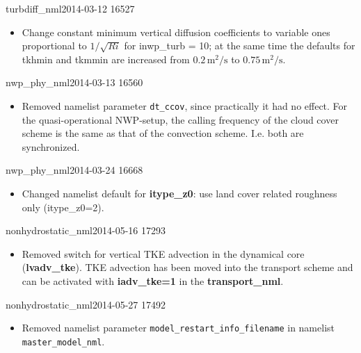 \begin{changeitem}{turbdiff\_nml}{2014-03-12 }{16527 }
  \begin{itemize}
   \item Change constant minimum vertical diffusion coefficients to variable ones proportional to $1/\sqrt{Ri}$ for inwp\_turb = 10; at the same time
         the defaults for tkhmin and tkmmin are increased from $0.2 \, \mathrm{m^2/s}$ to $0.75 \, \mathrm{m^2/s}$.
  \end{itemize}
\end{changeitem}

\begin{changeitem}{nwp\_phy\_nml}{2014-03-13 }{16560 }
  \begin{itemize}
   \item Removed namelist parameter \texttt{dt\_ccov}, since practically it had no effect. For the  quasi-operational NWP-setup, the calling frequency of the cloud cover scheme is the same as that of the convection scheme. I.e. both are synchronized.
  \end{itemize}
\end{changeitem}

\begin{changeitem}{nwp\_phy\_nml}{2014-03-24 }{16668 }
  \begin{itemize}
   \item Changed namelist default for \textbf{itype\_z0}: use land cover related roughness only (itype\_z0=2).
  \end{itemize}
\end{changeitem}

\begin{changeitem}{nonhydrostatic\_nml}{2014-05-16 }{17293 }
  \begin{itemize}
   \item Removed switch for vertical TKE advection in the dynamical core (\textbf{lvadv\_tke}). TKE advection has been moved into the
   transport scheme and can be activated with \textbf{iadv\_tke=1} in the \textbf{transport\_nml}.
  \end{itemize}
\end{changeitem}

\begin{changeitem}{nonhydrostatic\_nml}{2014-05-27 }{17492}
  \begin{itemize}
   \item Removed namelist parameter \texttt{model\_restart\_info\_filename} in namelist
         \texttt{master\_model\_nml}.
  \end{itemize}
\end{changeitem}

